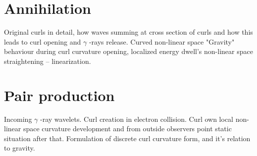 \section{Annihilation}
\label{annihilation}

Original curls in detail, how waves summing at cross section of curls and how
this leads to curl opening and $\gamma$ -rays release. Curved non-linear
space "Gravity" behaviour during curl curvature opening, localized energy
dwell's non-linear space straightening -- linearization.

\section{Pair production}
\label{pair_production}

Incoming $\gamma$ -ray wavelets. Curl creation in electron collision. Curl
own local non-linear space curvature development and from outside observers
point static situation after that. Formulation of discrete curl curvature
form, and it's relation to gravity.

